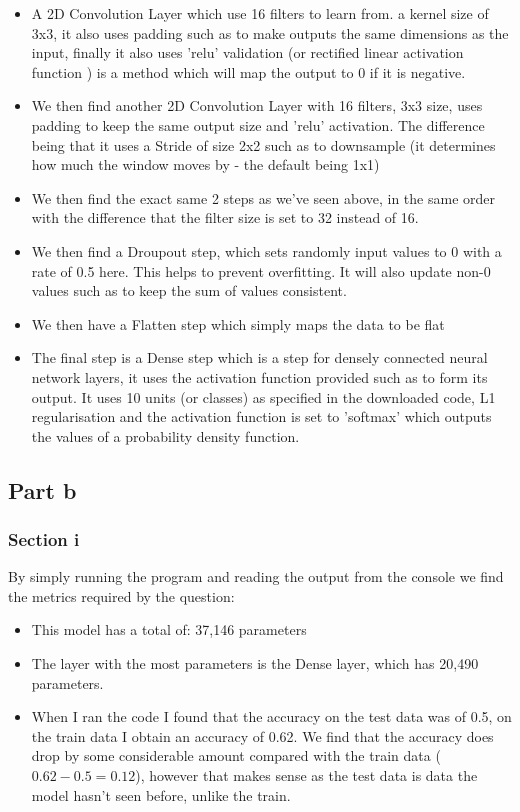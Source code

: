 \documentclass[10pt]{article}
\begin{document}
\begin{itemize}
    \item A 2D Convolution Layer which use 16 filters to learn from. a kernel size of 3x3,
    it also uses padding such as to make outputs the same dimensions as the input, finally
    it also uses 'relu' validation (or rectified linear activation function 
    ) is a method which will map the output to 0 if it is negative.
    \item We then find another 2D Convolution Layer with 16 filters,
    3x3 size, uses padding to keep the same output size and 'relu' activation. The
    difference being that it uses a Stride of size 2x2 such as to downsample
    (it determines how much the window moves by - the default being 1x1)
    \item We then find the exact same 2 steps as we've seen above, in the
    same order with the difference that the filter size is set to 32 instead of 16.
    \item We then find a Droupout step, which sets randomly input values to 0
    with a rate of 0.5 here. This helps to prevent overfitting. It will also
    update non-0 values such as to keep the sum of values consistent.
    \item We then have a Flatten step which simply maps the data to be flat
    \item The final step is a Dense step which is a step for densely connected neural network layers,
    it uses the activation function provided such as to form its output. It uses 10 units (or classes) as specified
    in the downloaded code, L1 regularisation and the activation function is set to
    'softmax' which outputs the values of a probability density function.
\end{itemize}

\subsection*{Part b}
\subsubsection*{Section i}
By simply running the program and reading the output from the
console we find the metrics required by the question:

\begin{itemize}
    \item This model has a total of: 37,146 parameters
    \item The layer with the most parameters is the Dense layer,
    which has 20,490 parameters.
    \item When I ran the code I found that the accuracy on the
    test data was of 0.5, on the train data I obtain an accuracy
    of 0.62. We find that the accuracy does drop by some considerable
    amount compared with the train data ($0.62 - 0.5 = 0.12$), however that makes sense
    as the test data is data the model hasn't seen before, unlike the train.
\end{itemize}
\end{document}
